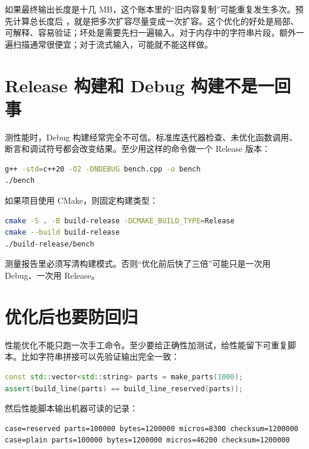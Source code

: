 如果最终输出长度是十几 MB，这个账本里的“旧内容复制”可能重复发生多次。预先计算总长度后 ，就是把多次扩容尽量变成一次扩容。这个优化的好处是局部、可解释、容易验证；坏处是需要先扫一遍输入。对于内存中的字符串片段，额外一遍扫描通常很便宜；对于流式输入，可能就不能这样做。

\section{Release 构建和 Debug 构建不是一回事}

测性能时，Debug 构建经常完全不可信。标准库迭代器检查、未优化函数调用、断言和调试符号都会改变结果。至少用这样的命令做一个 Release 版本：

\begin{lstlisting}[language=bash,caption={用优化构建测量样本}]
g++ -std=c++20 -O2 -DNDEBUG bench.cpp -o bench
./bench
\end{lstlisting}

如果项目使用 CMake，则固定构建类型：

\begin{lstlisting}[language=bash,caption={CMake Release 构建}]
cmake -S . -B build-release -DCMAKE_BUILD_TYPE=Release
cmake --build build-release
./build-release/bench
\end{lstlisting}

测量报告里必须写清构建模式。否则“优化前后快了三倍”可能只是一次用 Debug、一次用 Release。

\section{优化后也要防回归}

性能优化不能只跑一次手工命令。至少要给正确性加测试，给性能留下可重复脚本。比如字符串拼接可以先验证输出完全一致：

\begin{lstlisting}[language=C++,caption={优化前后结果必须一致}]
const std::vector<std::string> parts = make_parts(1000);
assert(build_line(parts) == build_line_reserved(parts));
\end{lstlisting}

然后性能脚本输出机器可读的记录：

\begin{lstlisting}[caption={性能记录示例}]
case=reserved parts=100000 bytes=1200000 micros=8300 checksum=1200000
case=plain parts=100000 bytes=1200000 micros=46200 checksum=1200000
\end{lstlisting}

